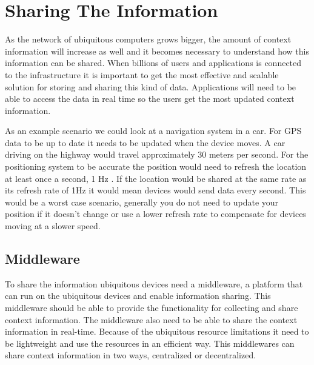 \section{Sharing The Information}
As the network of ubiquitous computers grows bigger, the amount of context information will increase as well and it becomes necessary to understand how this information can be shared. When billions of users and applications is connected to the infrastructure it is important to get the most effective and scalable solution for storing and sharing this kind of data. Applications will need to be able to access the data in real time so the users get the most updated context information. 

As an example scenario we could look at a navigation system in a car. For GPS data to be up to date it needs to be updated when the device moves. A car driving on the highway would travel approximately 30 meters per second. For the positioning system to be accurate the position would need to refresh the location at least once a second, 1 Hz \cite{portas2010validity}. If the location would be shared at the same rate as its refresh rate of 1Hz it would mean devices would send data every second. This would be a worst case scenario, generally you do not need to update your position if it doesn't change or use a lower refresh rate to compensate for devices moving at a slower speed.

\subsection{Middleware}
To share the information ubiquitous devices need a middleware, a platform that can run on the ubiquitous devices and enable information sharing. This middleware should be able to provide the functionality for collecting and share context information. The middleware also need to be able to share the context information in real-time. Because of the ubiquitous resource limitations it need to be lightweight and use the resources in an efficient way. This middlewares can share context information in two ways, centralized or decentralized.

